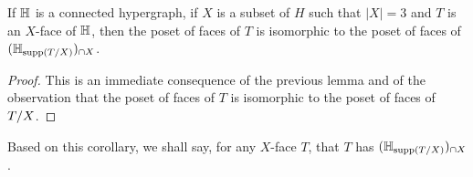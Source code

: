  \begin{corollary} 
  \label{instance-construct-general} 
  If ${\mathbb H}$ is a connected hypergraph, if $X$ is a subset of $H$ such that $|X|=3$ and $T$ is an $X$-face of ${\mathbb H}$, then the poset of faces of $T$ is isomorphic to the poset of faces of~$({\mathbb H}_{\mathrm{supp}(T/X)})_{\cap X}$.
\end{corollary}

\begin{proof} This is an immediate consequence of the previous lemma and of the observation that the poset of faces of $T$ is isomorphic to the poset of faces of $T/X$.
\end{proof}
 
Based on this corollary, we shall say, for any $X$-face $T$, that $T$ has  
$({\mathbb H}_{\mathrm{supp}(T/X)})_{\cap X}$.





